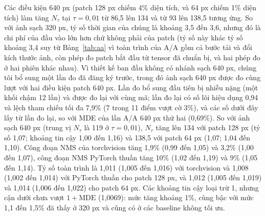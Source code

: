 \documentclass[a4paper,fleqn]{cas-dc}
\newcommand{\Ntau}{N_{\tau}}
\begin{document}
Các điều kiện 640 px (patch 128 px chiếm 4\% diện tích, và 64 px chiếm 1\% diện tích) làm tăng $\Ntau$ tại $\tau=0{,}01$ từ 86,5 lên 134 và từ 93 lên 138,5 tương ứng. So với ảnh sạch 320 px, tỷ số thời gian của chúng là khoảng 3,5 đến 3,6, nhưng đó là chi phí của đầu vào lớn hơn chứ không phải của patch (tỷ số này khác tỷ số khoảng 3,4 suy từ Bảng~\ref{tab:aa} vì toàn trình của A/A gồm cả bước tải và đổi kích thước ảnh, còn phép đo patch bắt đầu từ tensor đã chuẩn bị, và hai phép đo ở hai phiên khác nhau). Vì thiết kế ban đầu không có nhánh sạch 640 px, chúng tôi bổ sung một lần đo đã đăng ký trước, trong đó ảnh sạch 640 px được đo cùng lượt với hai điều kiện patch 640 px. Lần đo bổ sung đầu tiên bị nhiễu nặng (một khối chậm 12 lần) và được đo lại với cùng mã; lần đo lại có số lõi hiệu dụng 0,94 và lệch tham chiếu tối đa 7,9\% (7 trong 11 điểm vượt cờ 3\%), và các số dưới đây lấy từ lần đo lại, so với MDE của lần A/A 640 px thứ hai (0,69\%). So với ảnh sạch 640 px (trung vị $\Ntau$ là 119 ở $\tau=0{,}01$), $\Ntau$ tăng lên 134 với patch 128 px (tỷ số 1,07; khoảng tin cậy 1,00 đến 1,16) và 138,5 với patch 64 px (1,07; 1,04 đến 1,10). Công đoạn NMS của torchvision tăng 1,9\% (0,99 đến 1,05) và 3,2\% (1,00 đến 1,07), công đoạn NMS PyTorch thuần tăng 10\% (1,02 đến 1,19) và 9\% (1,05 đến 1,14). Tỷ số toàn trình là 1,011 (1,005 đến 1,016) với torchvision và 1,008 (1,002 đến 1,014) với PyTorch thuần cho patch 128 px, và 1,012 (1,005 đến 1,019) và 1,014 (1,006 đến 1,022) cho patch 64 px. Các khoảng tin cậy loại trừ 1, nhưng cận dưới chưa vượt $1+\mathrm{MDE}$ (1,0069): mức tăng khoảng 1\%, cùng bậc với mức 1,1 đến 1,5\% đã thấy ở 320 px và cũng có ở các baseline không tối ưu.
\end{document}
